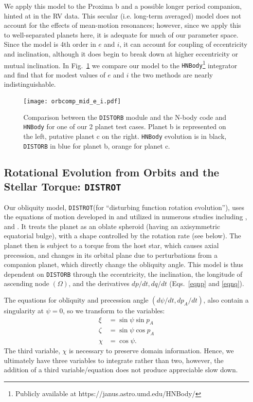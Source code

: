 \documentclass[preprint,12pt]{aastex}
\newcommand{\xxx}[1]{{\color{red} #1}} %
\def\distorb{\texttt{\footnotesize{DISTORB}}\xspace}
\def\distrot{\texttt{\footnotesize{DISTROT}}\xspace}
\begin{document}
We apply this model to the Proxima b and a possible longer period
companion, hinted at in the RV data. This secular (i.e. long-term
averaged) model does not account for the effects of mean-motion
resonances; however, since we apply this to well-separated planets
here, it is adequate for much of our parameter space. Since the model
is 4th order in $e$ and $i$, it can account for coupling of
eccentricity and inclination, although it does begin to break down at
higher eccentricity or mutual inclination. In
Fig.~\ref{fig:orbitvalid} we compare our model to the
{\footnotesize \texttt{HNBody}}\footnote{\xxx{Publicly available at
 https://janus.astro.umd.edu/HNBody/}}
integrator \citep{RauchHamilton02} and find that for modest values of
$e$ and $i$ the two methods are nearly indistinguishable.
 
\begin{figure}
\texttt{[image: orbcomp\_mid\_e\_i.pdf]}
\caption{Comparison between the \distorb module and the N-body code and 
   {\footnotesize \texttt{HNBody}} for one of our 2
   planet test cases. Planet b is represented on the left, putative
   planet c on the right. {\footnotesize \texttt{HNBody}} evolution is in 
   black, \distorb in blue for planet b, orange for planet c.}
\label{fig:orbitvalid}
\end{figure} 

\subsection{Rotational Evolution from Orbits and the Stellar Torque: \distrot}
\label{sec:models:distrot}
Our obliquity model, \distrot (for ``disturbing function rotation
evolution''), uses the equations of motion developed in
\cite{Kinoshita1975, Kinoshita1977} and utilized in numerous studies 
including  \cite{Laskar1986,Laskar1993a,Laskar1993b}, and \cite{Armstrong14}.  
It treats the planet as an oblate spheroid (having an axisymmetric equatorial
bulge), with a shape controlled by the rotation rate (see below). The planet then is
subject to a torque from the host star, which causes axial precession,
and changes in its orbital plane due to perturbations from a companion
planet, which directly change the obliquity angle.  This model is thus
dependent on \distorb through the eccentricity, the inclination, the 
longitude of ascending node $(\Omega)$, and the derivatives $dp/dt,
dq/dt$ (Eqs.~\ref{eqnp} and \ref{eqnq}).

The equations for obliquity and precession angle $(d\psi/dt,
dp_A/dt)$, also contain a singularity at $\psi = 0$, so we transform
to the variables:
\begin{align}
\xi & = \sin{\psi} \sin{p_A} \\
\zeta & = \sin{\psi} \cos{p_A} \\
\chi & = \cos{\psi}.
\end{align}
The third variable, $\chi$ is necessary to preserve domain information. Hence,
we ultimately have three variables to integrate rather than two, however, the
addition of a third variable/equation does not produce appreciable slow down.
\end{document}
